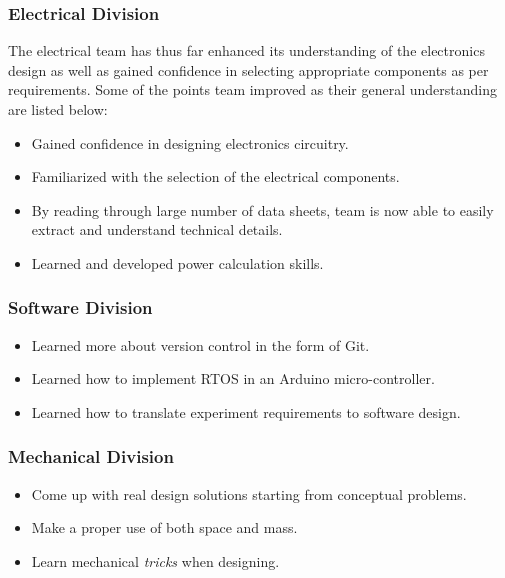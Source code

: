 \documentclass[a4paper,12pt,twoside]{article}
\begin{document}
\subsubsection{Electrical Division}
The electrical team has thus far enhanced its understanding of the electronics design as well as gained confidence in selecting appropriate components as per requirements. Some of the points team improved as their general understanding are listed below:  
\begin{itemize}

    \item Gained confidence in designing electronics circuitry.
    \item Familiarized with the selection of the electrical components. 
    \item By reading through large number of data sheets, team is now able to easily extract and understand technical details. 
    \item Learned and developed power calculation skills.
\end{itemize}


\subsubsection{Software Division}

\begin{itemize}
    \item Learned more about version control in the form of Git.
    \item Learned how to implement RTOS in an Arduino micro-controller.
    \item Learned how to translate experiment requirements to software design.
\end{itemize}


\subsubsection{Mechanical Division}

\begin{itemize}
    \item Come up with real design solutions starting from conceptual problems.
    \item Make a proper use of both space and mass.
    \item Learn mechanical \textit{tricks} when designing. 

\end{itemize}
\end{document}
